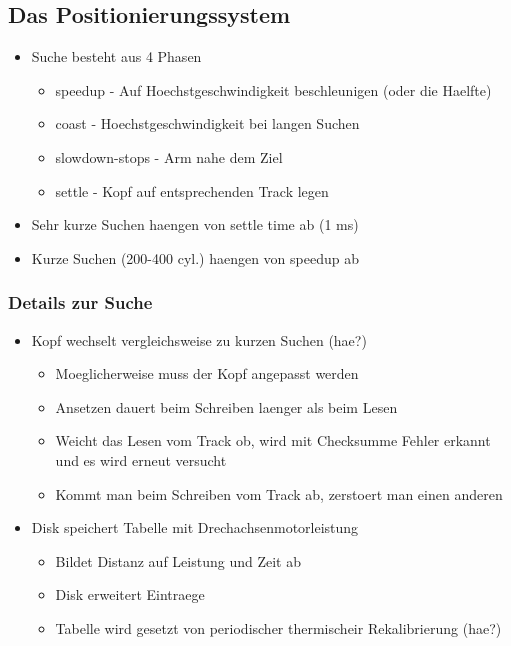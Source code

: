 \documentclass[a4paper]{scrreprt}
\begin{document}
\subsection{Das Positionierungssystem}
\begin{itemize}
	\item Suche besteht aus 4 Phasen
		\begin{itemize}
			\item speedup - Auf Hoechstgeschwindigkeit beschleunigen (oder die Haelfte)
			\item coast - Hoechstgeschwindigkeit bei langen Suchen
			\item slowdown-stops - Arm nahe dem Ziel
			\item settle - Kopf auf entsprechenden Track legen
		\end{itemize}
	\item Sehr kurze Suchen haengen von settle time ab (1 ms)
	\item Kurze Suchen (200-400 cyl.) haengen von speedup ab
\end{itemize}

\subsubsection{Details zur Suche}
\begin{itemize}
	\item Kopf wechselt vergleichsweise zu kurzen Suchen (hae?)
		\begin{itemize}
			\item Moeglicherweise muss der Kopf angepasst werden
			\item Ansetzen dauert beim Schreiben laenger als beim Lesen
			\item Weicht das Lesen vom Track ob, wird mit Checksumme Fehler erkannt und es wird erneut versucht
			\item Kommt man beim Schreiben vom Track ab, zerstoert man einen anderen
		\end{itemize}
	\item Disk speichert Tabelle mit Drechachsenmotorleistung
		\begin{itemize}
			\item Bildet Distanz auf Leistung und Zeit ab
			\item Disk erweitert Eintraege
			\item Tabelle wird gesetzt von periodischer thermischeir Rekalibrierung (hae?)
		\end{itemize}
\end{itemize}
\end{document}
